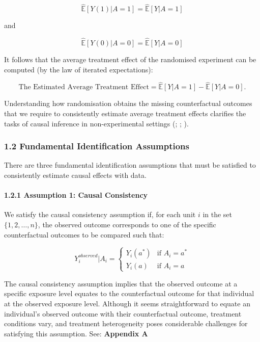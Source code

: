 \documentclass[
  singlecolumn]{article}
\let\oldparagraph\paragraph
\renewcommand{\paragraph}[1]{\oldparagraph{#1}\mbox{}}
\begin{document}
\[\widehat{\mathbb{E}}[Y(1) | A = 1] = \widehat{\mathbb{E}}[Y| A = 1]\]

and

\[\widehat{\mathbb{E}}[Y(0) | A = 0] = \widehat{\mathbb{E}}[Y| A = 0]\]

It follows that the average treatment effect of the randomised
experiment can be computed (by the law of iterated expectations):

\[
\text{The Estimated Average Treatment Effect} = \widehat{\mathbb{E}}[Y | A = 1] - \widehat{\mathbb{E}}[Y | A = 0].
\]

Understanding how randomisation obtains the missing counterfactual
outcomes that we require to consistently estimate average treatment
effects clarifies the tasks of causal inference in non-experimental
settings (;
;
).

\subsubsection{1.2 Fundamental Identification
Assumptions}\label{fundamental-identification-assumptions}

There are three fundamental identification assumptions that must be
satisfied to consistently estimate causal effects with data.

\paragraph{1.2.1 Assumption 1: Causal
Consistency}\label{assumption-1-causal-consistency}

We satisfy the causal consistency assumption if, for each unit \(i\) in
the set \(\{1, 2, \ldots, n\}\), the observed outcome corresponds to one
of the specific counterfactual outcomes to be compared such that:

\[
Y_i^{observed}|A_i = 
\begin{cases} 
Y_i(a^*) & \text{if } A_i = a^* \\
Y_i(a) & \text{if } A_i = a
\end{cases}
\]

The causal consistency assumption implies that the observed outcome at a
specific exposure level equates to the counterfactual outcome for that
individual at the observed exposure level. Although it seems
straightforward to equate an individual's observed outcome with their
counterfactual outcome, treatment conditions vary, and treatment
heterogeneity poses considerable challenges for satisfying this
assumption. See: \textbf{Appendix A}
\end{document}
